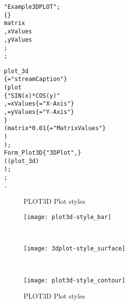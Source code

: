 \begin{boxedminipage}[t]{\linewidth}
\begin{alltt}
\DESCRIPTION "Example 3D PLOT";
\DATAPOOL
  \REAL \{\EDITABLE\}
    matrix
   ,xValues
   ,yValues
   ;
\END \DATAPOOL;

\UIMANAGER
  \PLOTTHREED
    plot_3d
      \{ \CAPTION = "streamCaption" \}
      ( plot
           \{ "SIN(x) * COS(y)"
           , \XAXIS = xValues \{ \LABEL = "X-Axis" \}
           , \YAXIS = yValues \{ \LABEL = "Y-Axis" \}
           \}
         ( matrix * 0.01 \{ \LABEL = "Matrix Values" \}
         )
      );
  \FORM
    Form_Plot3D \{"3D Plot", \HIDECYCLE\}
      ( ( plot_3d )
      );
\END \UIMANAGER;
\END.
\end{alltt}
\end{boxedminipage}


%
\newpage

%
\begin{figure}[h]\label{fig:plot3dPlotStyles}
  \begin{center}
    {\LARGE PLOT3D Plot styles \\[2ex]}
    \begin{minipage}{0.45\linewidth}
      \begin{center}
        \texttt{[image: plot3d-style\_bar]}
        \label{hc:plot3d_style_bar}
      \end{center}
    \end{minipage} \\[3ex]

    \begin{minipage}{0.45\linewidth}
      \begin{center}
        \texttt{[image: 3dplot-style\_surface]}
        \label{hc:plot3d_style_surface}
      \end{center}
    \end{minipage} \\[3ex]

    \begin{minipage}{0.45\linewidth}
      \begin{center}
        \texttt{[image: plot3d-style\_contour]}
        \label{hc:plot3d_style_contour}
      \end{center}
    \end{minipage}
  \end{center}
  \caption{PLOT3D Plot styles}
\end{figure}
